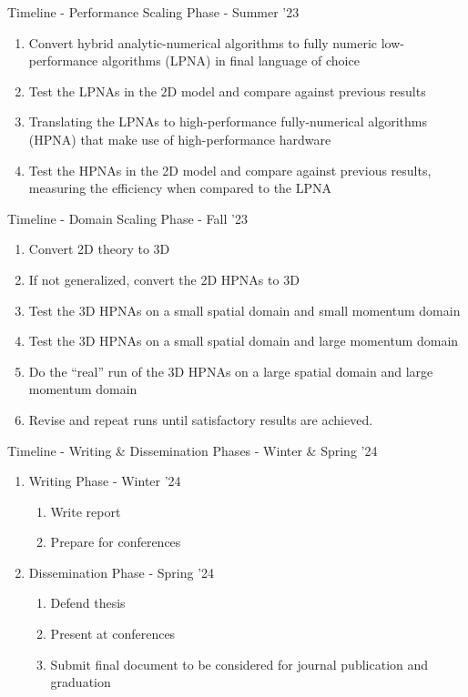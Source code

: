 \documentclass[aspectratio=169]{beamer}
\begin{document}
    \begin{frame}{Timeline - Performance Scaling Phase - Summer '23}
        \begin{enumerate}
            \item Convert hybrid analytic-numerical algorithms to fully numeric low-performance algorithms (LPNA) in final language of choice
            \item Test the LPNAs in the 2D model and compare against previous results%
            \item Translating the LPNAs to high-performance fully-numerical algorithms (HPNA) that make use of high-performance hardware
            \item Test the HPNAs in the 2D model and compare against previous results, measuring the efficiency when compared to the LPNA
        \end{enumerate}
    \end{frame}

    \begin{frame}{Timeline - Domain Scaling Phase - Fall '23}
        \begin{enumerate}
            \item Convert 2D theory to 3D
            \item If not generalized, convert the 2D HPNAs to 3D
            \item Test the 3D HPNAs on a small spatial domain and small momentum domain
            \item Test the 3D HPNAs on a small spatial domain and large momentum domain
            \item Do the ``real'' run of the 3D HPNAs on a large spatial domain and large momentum domain
            \item Revise and repeat runs until satisfactory results are achieved.
        \end{enumerate}
    \end{frame}

    \begin{frame}{Timeline - Writing \& Dissemination Phases - Winter \& Spring '24}
        \begin{enumerate}
            \item Writing Phase - Winter '24
                \begin{enumerate}
                    \item Write report
                    \item Prepare for conferences
                \end{enumerate}
            \item Dissemination Phase - Spring '24
                \begin{enumerate}
                    \item Defend thesis
                    \item Present at conferences
                    \item Submit final document to be considered for journal publication and graduation
                \end{enumerate}
        \end{enumerate}
    \end{frame}
\end{document}
